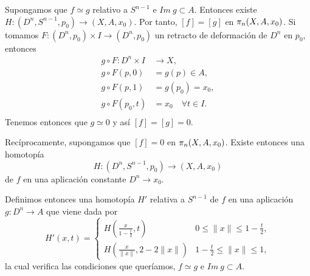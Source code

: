 \begin{demo}
Supongamos que $f \simeq g$ relativo a $S^{n-1}$ e $Im \ g \subset A$. Entonces existe $H : (D^n, S^{n-1}, p_0) \longrightarrow (X, A, x_0)$. Por tanto, $[f] = [g]$ en $\pi_{n}(X, A, x_0)$. Si tomamos $F: (D^n, p_0) \times I \longrightarrow (D^n, p_0)$ un retracto de deformación de $D^n$ en $p_0$, entonces 
\begin{align*}
g \circ F : D^n \times I &\longrightarrow X, \\
g \circ F (p,0) &= g(p) \in A, \\
g \circ F (p,1) &= g(p_0) = x_0, \\
g \circ F (p_0, t) &= x_0 \quad \forall t \in I. \\
\end{align*}
Tenemos entonces que $g \simeq 0$ y así $[f]=[g]=0$. \par
Recíprocamente, supongamos que $[f] = 0$ en $\pi_{n}(X, A, x_0)$. Existe entonces una homotopía
\[
H : (D^n, S^{n-1}, p_0) \longrightarrow (X, A, x_0)
\]
de $f$ en una aplicación constante $D^n \longrightarrow x_0$. \par
Definimos entonces una homotopía $H'$ relativa a $S^{n-1}$ de $f$ en una aplicación $g: D^n \longrightarrow A$ que viene dada por
\[
H'(x,t) = 
\begin{cases}
H\left(\frac{x}{1- \frac{t}{2}}, t\right) & 0 \leq \|x \| \leq 1 - \frac{t}{2}, \\
H\left(\frac{x}{\| x \|}, 2 - 2 \| x \|\right) & 1 -\frac{t}{2} \leq \| x \| \leq 1,
\end{cases}
\]
la cual verifica las condiciones que queríamos, $f \simeq g$ e $Im \ g \subset A$.
\end{demo}


